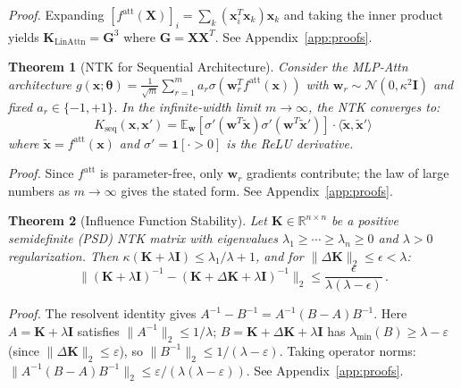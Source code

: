 \documentclass{article}
\theoremstyle{plain}
\newtheorem{theorem}{Theorem}[section]
\theoremstyle{definition}
\theoremstyle{remark}
\newcommand{\R}{\mathbb{R}}
\newcommand{\E}{\mathbb{E}}
\begin{document}
\emph{Proof.} Expanding $[f^{\text{att}}(\mathbf{X})]_i = \sum_k (\mathbf{x}_i^T\mathbf{x}_k)\mathbf{x}_k$ and taking the inner product yields $\mathbf{K}_{\text{LinAttn}} = \mathbf{G}^3$ where $\mathbf{G} = \mathbf{X}\mathbf{X}^T$. See Appendix~\ref{app:proofs}.

\begin{theorem}[NTK for Sequential Architecture]
\label{thm:ntk_correspondence}
Consider the MLP-Attn architecture $g(\mathbf{x}; \boldsymbol{\theta}) = \frac{1}{\sqrt{m}} \sum_{r=1}^{m} a_r \sigma(\mathbf{w}_r^T f^{\text{att}}(\mathbf{x}))$ with $\mathbf{w}_r \sim \mathcal{N}(0, \kappa^2 \mathbf{I})$ and fixed $a_r \in \{-1, +1\}$. In the infinite-width limit $m \to \infty$, the NTK converges to:
\begin{equation}
K_{\text{seq}}(\mathbf{x}, \mathbf{x}') = \E_{\mathbf{w}}[\sigma'(\mathbf{w}^T \tilde{\mathbf{x}})\sigma'(\mathbf{w}^T \tilde{\mathbf{x}}')] \cdot \langle \tilde{\mathbf{x}}, \tilde{\mathbf{x}}' \rangle
\end{equation}
where $\tilde{\mathbf{x}} = f^{\text{att}}(\mathbf{x})$ and $\sigma' = \mathbf{1}[\cdot > 0]$ is the ReLU derivative.
\end{theorem}

\emph{Proof.} Since $f^{\text{att}}$ is parameter-free, only $\mathbf{w}_r$ gradients contribute; the law of large numbers as $m \to \infty$ gives the stated form. See Appendix~\ref{app:proofs}.

\begin{theorem}[Influence Function Stability]
\label{thm:influence_stability}
Let $\mathbf{K} \in \R^{n \times n}$ be a positive semidefinite (PSD) NTK matrix with eigenvalues $\lambda_1 \geq \cdots \geq \lambda_n \geq 0$ and $\lambda > 0$ regularization. Then $\kappa(\mathbf{K} + \lambda\mathbf{I}) \leq \lambda_1/\lambda + 1$, and for $\|\Delta \mathbf{K}\|_2 \leq \epsilon < \lambda$:
$$\|(\mathbf{K} + \lambda\mathbf{I})^{-1} - (\mathbf{K} + \Delta\mathbf{K} + \lambda\mathbf{I})^{-1}\|_2 \leq \frac{\epsilon}{\lambda(\lambda - \epsilon)}\,.$$
\end{theorem}

\emph{Proof.} The resolvent identity gives $A^{-1} - B^{-1} = A^{-1}(B - A)B^{-1}$. Here $A = \mathbf{K}+\lambda\mathbf{I}$ satisfies $\|A^{-1}\|_2 \leq 1/\lambda$; $B = \mathbf{K}+\Delta\mathbf{K}+\lambda\mathbf{I}$ has $\lambda_{\min}(B) \geq \lambda - \varepsilon$ (since $\|\Delta\mathbf{K}\|_2 \leq \varepsilon$), so $\|B^{-1}\|_2 \leq 1/(\lambda-\varepsilon)$. Taking operator norms: $\|A^{-1}(B-A)B^{-1}\|_2 \leq \varepsilon/(\lambda(\lambda-\varepsilon))$. See Appendix~\ref{app:proofs}.
\end{document}
